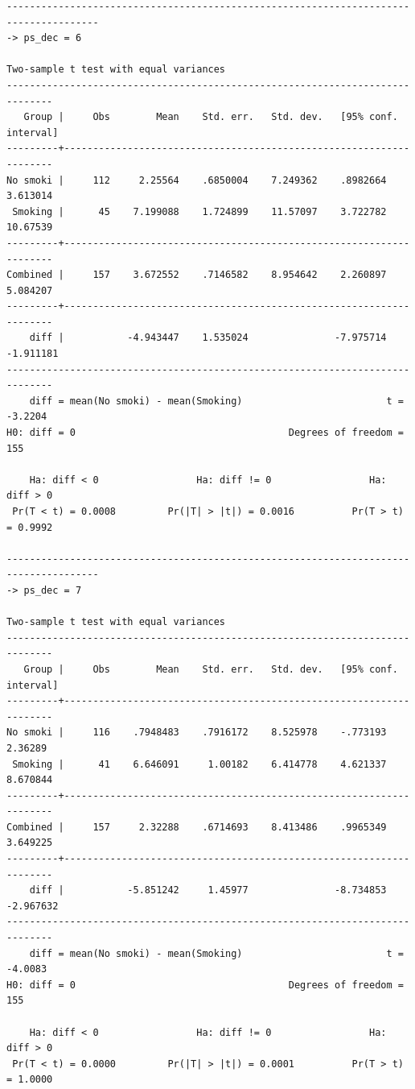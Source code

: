 \documentclass[
  10pt,
  a4paper,
]{book}
\begin{document}
\begin{verbatim}
--------------------------------------------------------------------------------------
-> ps_dec = 6

Two-sample t test with equal variances
------------------------------------------------------------------------------
   Group |     Obs        Mean    Std. err.   Std. dev.   [95% conf. interval]
---------+--------------------------------------------------------------------
No smoki |     112     2.25564    .6850004    7.249362    .8982664    3.613014
 Smoking |      45    7.199088    1.724899    11.57097    3.722782    10.67539
---------+--------------------------------------------------------------------
Combined |     157    3.672552    .7146582    8.954642    2.260897    5.084207
---------+--------------------------------------------------------------------
    diff |           -4.943447    1.535024               -7.975714   -1.911181
------------------------------------------------------------------------------
    diff = mean(No smoki) - mean(Smoking)                         t =  -3.2204
H0: diff = 0                                     Degrees of freedom =      155

    Ha: diff < 0                 Ha: diff != 0                 Ha: diff > 0
 Pr(T < t) = 0.0008         Pr(|T| > |t|) = 0.0016          Pr(T > t) = 0.9992

--------------------------------------------------------------------------------------
-> ps_dec = 7

Two-sample t test with equal variances
------------------------------------------------------------------------------
   Group |     Obs        Mean    Std. err.   Std. dev.   [95% conf. interval]
---------+--------------------------------------------------------------------
No smoki |     116    .7948483    .7916172    8.525978    -.773193     2.36289
 Smoking |      41    6.646091     1.00182    6.414778    4.621337    8.670844
---------+--------------------------------------------------------------------
Combined |     157     2.32288    .6714693    8.413486    .9965349    3.649225
---------+--------------------------------------------------------------------
    diff |           -5.851242     1.45977               -8.734853   -2.967632
------------------------------------------------------------------------------
    diff = mean(No smoki) - mean(Smoking)                         t =  -4.0083
H0: diff = 0                                     Degrees of freedom =      155

    Ha: diff < 0                 Ha: diff != 0                 Ha: diff > 0
 Pr(T < t) = 0.0000         Pr(|T| > |t|) = 0.0001          Pr(T > t) = 1.0000


\end{verbatim}
\end{document}
